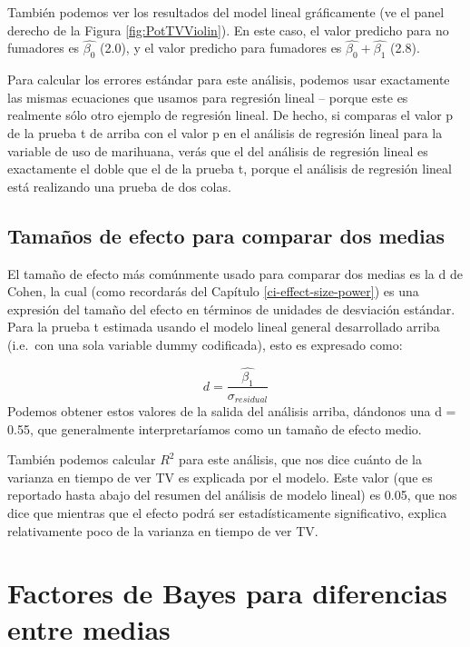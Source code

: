 \documentclass[
  12pt,
]{book}
\begin{document}
También podemos ver los resultados del model lineal gráficamente (ve el panel derecho de la Figura \ref{fig:PotTVViolin}). En este caso, el valor predicho para no fumadores es \(\hat{\beta_0}\) (2.0), y el valor predicho para fumadores es \(\hat{\beta_0} +\hat{\beta_1}\) (2.8).

Para calcular los errores estándar para este análisis, podemos usar exactamente las mismas ecuaciones que usamos para regresión lineal -- porque este es realmente sólo otro ejemplo de regresión lineal. De hecho, si comparas el valor p de la prueba t de arriba con el valor p en el análisis de regresión lineal para la variable de uso de marihuana, verás que el del análisis de regresión lineal es exactamente el doble que el de la prueba t, porque el análisis de regresión lineal está realizando una prueba de dos colas.

\hypertarget{tamauxf1os-de-efecto-para-comparar-dos-medias}{%
\subsection{Tamaños de efecto para comparar dos medias}\label{tamauxf1os-de-efecto-para-comparar-dos-medias}}

El tamaño de efecto más comúnmente usado para comparar dos medias es la d de Cohen, la cual (como recordarás del Capítulo \ref{ci-effect-size-power}) es una expresión del tamaño del efecto en términos de unidades de desviación estándar. Para la prueba t estimada usando el modelo lineal general desarrollado arriba (i.e.~con una sola variable dummy codificada), esto es expresado como:

\[
d = \frac{\hat{\beta_1}}{\sigma_{residual}}
\]
Podemos obtener estos valores de la salida del análisis arriba, dándonos una d = 0.55, que generalmente interpretaríamos como un tamaño de efecto medio.

También podemos calcular \(R^2\) para este análisis, que nos dice cuánto de la varianza en tiempo de ver TV es explicada por el modelo. Este valor (que es reportado hasta abajo del resumen del análisis de modelo lineal) es 0.05, que nos dice que mientras que el efecto podrá ser estadísticamente significativo, explica relativamente poco de la varianza en tiempo de ver TV.

\hypertarget{factores-de-bayes-para-diferencias-entre-medias}{%
\section{Factores de Bayes para diferencias entre medias}\label{factores-de-bayes-para-diferencias-entre-medias}}
\end{document}
